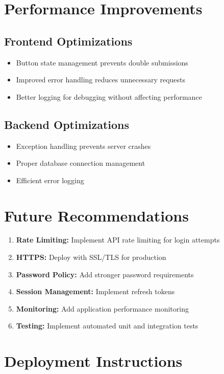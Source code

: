 \documentclass[12pt,a4paper]{article}
\begin{document}
\begin{table}[h]
\section{Performance Improvements}

\subsection{Frontend Optimizations}
\begin{itemize}
    \item Button state management prevents double submissions
    \item Improved error handling reduces unnecessary requests
    \item Better logging for debugging without affecting performance
\end{itemize}

\subsection{Backend Optimizations}
\begin{itemize}
    \item Exception handling prevents server crashes
    \item Proper database connection management
    \item Efficient error logging
\end{itemize}

\section{Future Recommendations}

\begin{enumerate}
    \item \textbf{Rate Limiting:} Implement API rate limiting for login attempts
    \item \textbf{HTTPS:} Deploy with SSL/TLS for production
    \item \textbf{Password Policy:} Add stronger password requirements
    \item \textbf{Session Management:} Implement refresh tokens
    \item \textbf{Monitoring:} Add application performance monitoring
    \item \textbf{Testing:} Implement automated unit and integration tests
\end{enumerate}

\section{Deployment Instructions}


\end{table}
\end{document}
